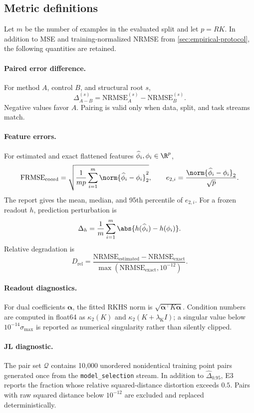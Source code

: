 \subsection{Metric definitions}
\label{app:protocol-metrics}

Let \(m\) be the number of examples in the evaluated split and let
\(p=R K\).  In addition to MSE and training-normalized NRMSE from
\cref{sec:empirical-protocol}, the following quantities are retained.

\paragraph{Paired error difference.}
For method \(A\), control \(B\), and structural root \(s\),
\[
 \Delta_{A-B}^{(s)}
 =\mathrm{NRMSE}^{(s)}_A-\mathrm{NRMSE}^{(s)}_B.
\]
Negative values favor \(A\).  Pairing is valid only when data, split, and task
streams match.

\paragraph{Feature errors.}
For estimated and exact flattened features
\(\widehat\phi_i,\phi_i\in\R^p\),
\[
 \mathrm{FRMSE}_{\mathrm{coord}}
 =\sqrt{\frac1{mp}\sum_{i=1}^m\norm{\widehat\phi_i-\phi_i}_2^2},
 \qquad
 e_{2,i}=\frac{\norm{\widehat\phi_i-\phi_i}_2}{\sqrt p}.
\]
The report gives the mean, median, and 95th percentile of \(e_{2,i}\).
For a frozen readout \(h\), prediction perturbation is
\[
 \Delta_h=\frac1m\sum_{i=1}^m
 \abs{h(\widehat\phi_i)-h(\phi_i)}.
\]
Relative degradation is
\[
 D_{\mathrm{rel}}
 =\frac{\mathrm{NRMSE}_{\mathrm{estimated}}
              -\mathrm{NRMSE}_{\mathrm{exact}}}
             {\max(\mathrm{NRMSE}_{\mathrm{exact}},10^{-12})}.
\]

\paragraph{Readout diagnostics.}
For dual coefficients \(\bm\alpha\), the fitted RKHS norm is
\(\sqrt{\bm\alpha^\top K\bm\alpha}\).  Condition numbers are computed in
float64 as \(\kappa_2(K)\) and
\(\kappa_2(K+\lambda_{\mathrm K}I)\); a singular value below
\(10^{-14}\sigma_{\max}\) is reported as numerical singularity rather than
silently clipped.

\paragraph{JL diagnostic.}
The pair set \(\mathcal Q\) contains 10,000 unordered nonidentical training
point pairs generated once from the \texttt{model\_selection} stream.  In
addition to \(\widehat\Delta_{0.95}\), E3 reports the fraction whose relative
squared-distance distortion exceeds \(0.5\).  Pairs with raw squared distance
below \(10^{-12}\) are excluded and replaced deterministically.

